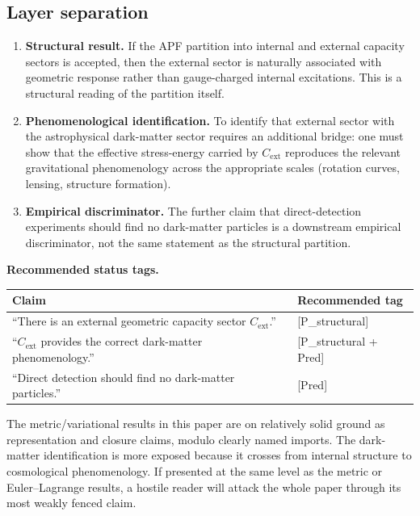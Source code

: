 \documentclass[11pt]{article}
\begin{document}
\subsection*{Layer separation}
\begin{enumerate}[leftmargin=1.6em]
    \item \textbf{Structural result.} If the APF partition into internal and
    external capacity sectors is accepted, then the external sector is naturally
    associated with geometric response rather than gauge-charged internal
    excitations. This is a structural reading of the partition itself.
    \item \textbf{Phenomenological identification.} To identify that external
    sector with the astrophysical dark-matter sector requires an additional
    bridge: one must show that the effective stress-energy carried by
    $C_{\mathrm{ext}}$ reproduces the relevant gravitational phenomenology
    across the appropriate scales (rotation curves, lensing, structure
    formation).
    \item \textbf{Empirical discriminator.} The further claim that direct-detection
    experiments should find no dark-matter particles is a downstream empirical
    discriminator, not the same statement as the structural partition.
\end{enumerate}

\begin{statusbox}
\textbf{Recommended status tags.}
\begin{center}
\begin{tabular}{@{}ll@{}}
\toprule
Claim & Recommended tag \\
\midrule
``There is an external geometric capacity sector $C_{\mathrm{ext}}$.'' & [P\_structural] \\
``$C_{\mathrm{ext}}$ provides the correct dark-matter phenomenology.'' & [P\_structural + Pred] \\
``Direct detection should find no dark-matter particles.'' & [Pred] \\
\bottomrule
\end{tabular}
\end{center}
The metric/variational results in this paper are on relatively solid ground as
representation and closure claims, modulo clearly named imports. The dark-matter
identification is more exposed because it crosses from internal structure to
cosmological phenomenology. If presented at the same level as the metric or
Euler--Lagrange results, a hostile reader will attack the whole paper through
its most weakly fenced claim.
\end{statusbox}
\end{document}

